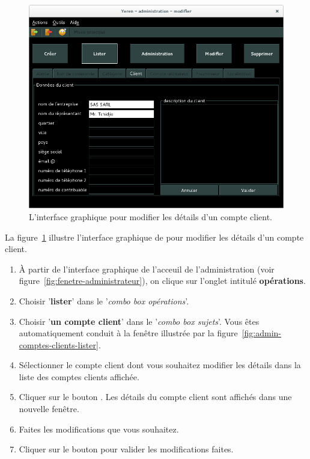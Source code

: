 \begin{figure}[!htpb]
	\centering
	\includegraphics[scale=0.45]{images/compte-client-modifier.png}
	\caption{L'interface graphique pour modifier les d\'etails
			d'un compte client.}
	\label{fig:admin-comptes-clients-modifier}
\end{figure}

La figure~\ref{fig:admin-comptes-clients-modifier} illustre
l'interface graphique de \yeroth pour modifier les
d\'etails d'un compte client.

\begin{enumerate}[1)]
	\item \`A partir de l'interface graphique de l'acceuil de
		l'administration (voir figure~\ref{fig:fenetre-administrateur}),
		on clique sur l'onglet intitul\'e \textbf{op\'erations}. 
		
	\item Choisir '\textbf{lister}' dans le '\emph{combo box
		op\'erations}'.
		
	\item Choisir '\textbf{un compte client}' dans le '\emph{combo box
		sujets}'. Vous \^etes automatiquement conduit \`a la fen\^etre
		illustr\'ee par la figure~\ref{fig:admin-comptes-clients-lister}.
		
	\item S\'electionner le compte client dont vous souhaitez
		modifier les d\'etails dans la liste des comptes
		clients affich\'ee.
		
	\item Cliquer sur le bouton . Les d\'etails
		du compte client sont affich\'es dans une nouvelle fen\^etre.
		
	\item Faites les modifications que vous souhaitez.
		
	\item Cliquer sur le bouton  pour valider
		les modifications faites.
\end{enumerate}

